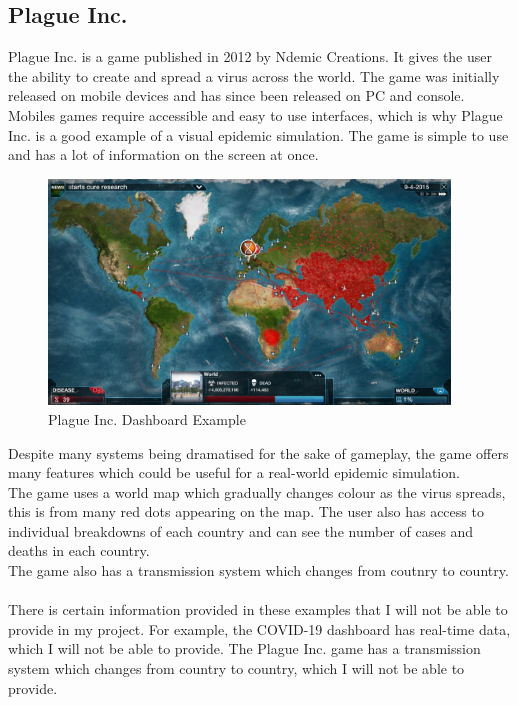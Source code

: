 \documentclass{report}
\begin{document}
\subsection{Plague Inc.}
Plague Inc. is a game published in 2012 by Ndemic Creations. It gives the user the ability to create and spread a virus across the world. The game was initially released on mobile devices and has since been released on PC and console.\\
Mobiles games require accessible and easy to use interfaces, which is why Plague Inc. is a good example of a visual epidemic simulation. The game is simple to use and has a lot of information on the screen at once.
\begin{center}
    \begin{figure}[h]
        \centering
        \includegraphics[width=0.95\textwidth]{Plague Inc Example.jpeg}
        \caption{Plague Inc. Dashboard Example}
        \label{fig:plagueinc_dashboard}
    \end{figure}
\end{center}
Despite many systems being dramatised for the sake of gameplay, the game offers many features which could be useful for a real-world epidemic simulation. \\
The game uses a world map which gradually changes colour as the virus spreads, this is from many red dots appearing on the map. The user also has access to individual breakdowns of each country and can see the number of cases and deaths in each country.\\ 
The game also has a transmission system which changes from coutnry to country. 
\\ \\
There is certain information provided in these examples that I will not be able to provide in my project. For example, the COVID-19 dashboard has real-time data, which I will not be able to provide. The Plague Inc. game has a transmission system which changes from country to country, which I will not be able to provide.\\
\end{document}
